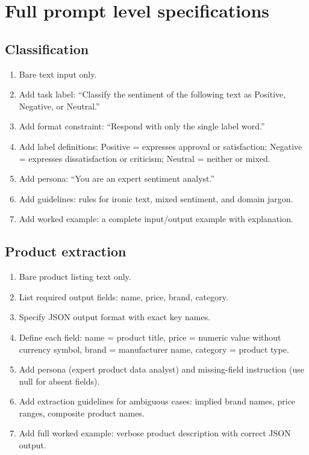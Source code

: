 \section{Full prompt level specifications}
\label{app:prompts}

\subsection{Classification}
\begin{enumerate}
  \item Bare text input only.
  \item Add task label: ``Classify the sentiment of the following text as
    Positive, Negative, or Neutral.''
  \item Add format constraint: ``Respond with only the single label word.''
  \item Add label definitions: Positive = expresses approval or satisfaction;
    Negative = expresses dissatisfaction or criticism; Neutral = neither or mixed.
  \item Add persona: ``You are an expert sentiment analyst.''
  \item Add guidelines: rules for ironic text, mixed sentiment, and domain jargon.
  \item Add worked example: a complete input/output example with explanation.
\end{enumerate}

\subsection{Product extraction}
\begin{enumerate}
  \item Bare product listing text only.
  \item List required output fields: name, price, brand, category.
  \item Specify JSON output format with exact key names.
  \item Define each field: name = product title, price = numeric value without
    currency symbol, brand = manufacturer name, category = product type.
  \item Add persona (expert product data analyst) and missing-field instruction
    (use null for absent fields).
  \item Add extraction guidelines for ambiguous cases: implied brand names,
    price ranges, composite product names.
  \item Add full worked example: verbose product description with correct JSON output.
\end{enumerate}

